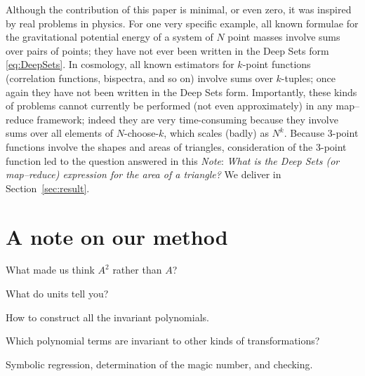 \documentclass[12pt]{article}
\newcommand{\documentname}{\textsl{Note}}
\newcommand{\sectionname}{Section}
\newcommand{\secref}[1]{\sectionname~\ref{#1}}
\begin{document}
Although the contribution of this paper is minimal, or even zero, it was inspired by real problems in physics.
For one very specific example, all known formulae for the gravitational potential energy of a system of $N$ point masses involve sums over pairs of points; they have not ever been written in the Deep Sets form \eqref{eq:DeepSets}.
In cosmology, all known estimators for $k$-point functions (correlation functions, bispectra, and so on) involve sums over $k$-tuples; once again they have not been written in the Deep Sets form.
Importantly, these kinds of problems cannot currently be performed (not even approximately) in any map--reduce framework; indeed they are very time-consuming because they involve sums over all elements of $N$-choose-$k$, which scales (badly) as $N^k$.
Because 3-point functions involve the shapes and areas of triangles, consideration of the 3-point function led to the question answered in this \documentname:
\emph{What is the Deep Sets (or map--reduce) expression for the area of a triangle?}
We deliver in \secref{sec:result}.

\section{A note on our method}\label{sec:method}
What made us think $A^2$ rather than $A$?

What do units tell you?

How to construct all the invariant polynomials.

Which polynomial terms are invariant to other kinds of transformations?

Symbolic regression, determination of the magic number, and checking.
\end{document}
